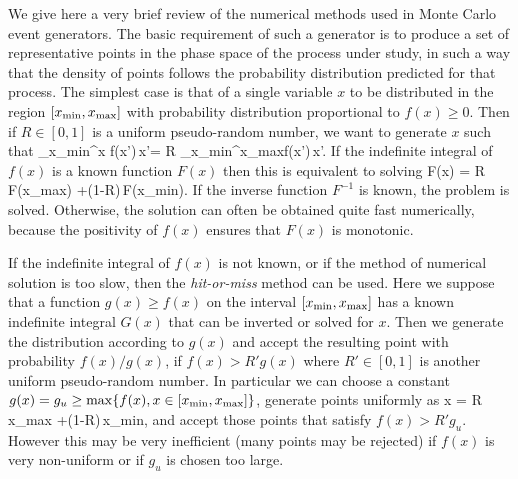 \label{mcmethods:dist}  
We give here a very brief review of the numerical methods used in
Monte Carlo event generators. The basic requirement of such a
generator is to produce a set of representative points in the phase
space of the process under study, in such a way that the density of points
follows the probability distribution predicted for that process. The
simplest case is that of a single variable $x$ to be distributed in
the region $[x_{\rm min},x_{\rm max}]$ with probability distribution
proportional to $f(x)\geq 0$.  Then if $R\in[0,1]$ is a uniform
pseudo-random number, we want to generate $x$ such that
\beq
\int_{x_{\rm min}}^{x} f(x')\,\done x'= R \int_{x_{\rm min}}^{x_{\rm max}}f(x')\,\done x'\;.
\eeq
If the indefinite integral of $f(x)$ is a known function $F(x)$ then
this is equivalent to solving
\beq\label{eq:mcFx}
F(x) = R\,F(x_{\rm max}) +(1-R)\,F(x_{\rm min})\;.
\eeq
If the inverse function $F^{-1}$ is known, the problem is solved.
Otherwise, the solution can often be obtained quite fast numerically,
because the positivity of $f(x)$ ensures that $F(x)$ is monotonic.

If the indefinite integral of $f(x)$ is not known, or if the method of
numerical solution is too slow, then the {\it hit-or-miss} method can
be used.  Here we suppose that a function $g(x)\geq f(x)$ on the
interval $[x_{\rm min},x_{\rm max}]$ has a known indefinite integral
$G(x)$ that can be inverted or solved for $x$. Then we generate the
distribution according to $g(x)$ and accept the resulting point with
probability $f(x)/g(x)$, \ie if $f(x)>R'g(x)$ where $R'\in[0,1]$ is
another uniform pseudo-random number.  In particular we can choose a
constant $g(x)=g_u\geq\max\{f(x),x\in [x_{\rm min},x_{\rm max}]\}$,
generate points uniformly as
\beq
x = R\,x_{\rm max} +(1-R)\,x_{\rm min}\;,
\eeq
and accept those points that satisfy $f(x)>R'g_u$.  However this may
be very inefficient (many points may be rejected) if $f(x)$ is very
non-uniform or if $g_u$ is chosen too large.

